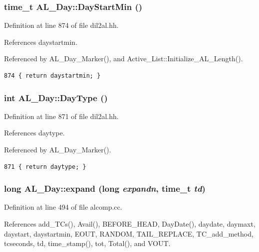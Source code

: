 \subsubsection{\setlength{\rightskip}{0pt plus 5cm}time\_\-t AL\_\-Day::Day\-Start\-Min ()\hspace{0.3cm}{\tt  [inline]}}\label{classAL__Day_a5}




Definition at line 874 of file dil2al.hh.

References daystartmin.

Referenced by AL\_\-Day\_\-Marker(), and Active\_\-List::Initialize\_\-AL\_\-Length().



\footnotesize\begin{verbatim}874 { return daystartmin; }
\end{verbatim}\normalsize 
{}
\subsubsection{\setlength{\rightskip}{0pt plus 5cm}int AL\_\-Day::Day\-Type ()\hspace{0.3cm}{\tt  [inline]}}\label{classAL__Day_a2}




Definition at line 871 of file dil2al.hh.

References daytype.

Referenced by AL\_\-Day\_\-Marker().



\footnotesize\begin{verbatim}871 { return daytype; }
\end{verbatim}\normalsize 
{}
\subsubsection{\setlength{\rightskip}{0pt plus 5cm}long AL\_\-Day::expand (long {\em expandn}, time\_\-t {\em td})}\label{classAL__Day_a19}




Definition at line 494 of file alcomp.cc.

References add\_\-TCs(), Avail(), BEFORE\_\-HEAD, Day\-Date(), daydate, daymaxt, daystart, daystartmin, EOUT, RANDOM, TAIL\_\-REPLACE, TC\_\-add\_\-method, tcseconds, td, time\_\-stamp(), tot, Total(), and VOUT.

